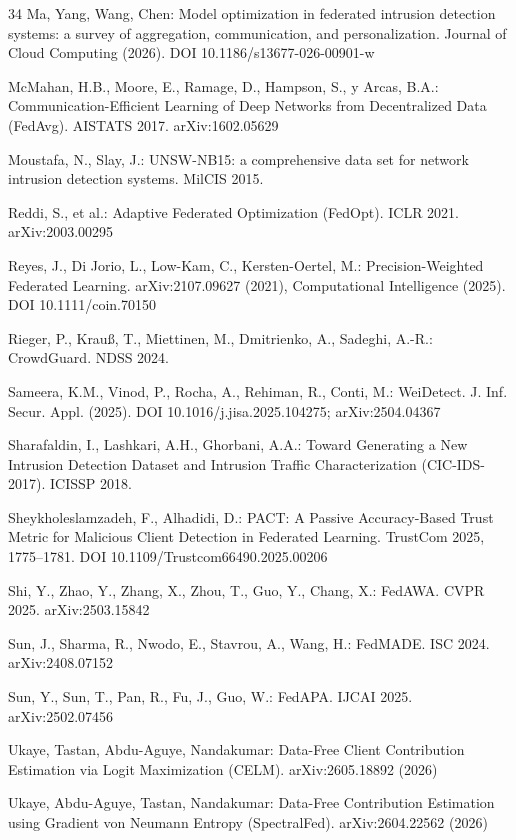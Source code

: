 \documentclass{llncs}
\begin{document}
\begin{thebibliography}{34}
 Ma, Yang, Wang, Chen: Model optimization in federated intrusion detection systems: a survey of aggregation, communication, and personalization. Journal of Cloud Computing (2026). DOI 10.1186/s13677-026-00901-w

 McMahan, H.B., Moore, E., Ramage, D., Hampson, S., y Arcas, B.A.: Communication-Efficient Learning of Deep Networks from Decentralized Data (FedAvg). AISTATS 2017. arXiv:1602.05629

 Moustafa, N., Slay, J.: UNSW-NB15: a comprehensive data set for network intrusion detection systems. MilCIS 2015.

 Reddi, S., et al.: Adaptive Federated Optimization (FedOpt). ICLR 2021. arXiv:2003.00295

 Reyes, J., Di Jorio, L., Low-Kam, C., Kersten-Oertel, M.: Precision-Weighted Federated Learning. arXiv:2107.09627 (2021), Computational Intelligence (2025). DOI 10.1111/coin.70150

 Rieger, P., Krau{\ss}, T., Miettinen, M., Dmitrienko, A., Sadeghi, A.-R.: CrowdGuard. NDSS 2024.

 Sameera, K.M., Vinod, P., Rocha, A., Rehiman, R., Conti, M.: WeiDetect. J. Inf. Secur. Appl. (2025). DOI 10.1016/j.jisa.2025.104275; arXiv:2504.04367

 Sharafaldin, I., Lashkari, A.H., Ghorbani, A.A.: Toward Generating a New Intrusion Detection Dataset and Intrusion Traffic Characterization (CIC-IDS-2017). ICISSP 2018.

 Sheykholeslamzadeh, F., Alhadidi, D.: PACT: A Passive Accuracy-Based Trust Metric for Malicious Client Detection in Federated Learning. TrustCom 2025, 1775--1781. DOI 10.1109/Trustcom66490.2025.00206

 Shi, Y., Zhao, Y., Zhang, X., Zhou, T., Guo, Y., Chang, X.: FedAWA. CVPR 2025. arXiv:2503.15842

 Sun, J., Sharma, R., Nwodo, E., Stavrou, A., Wang, H.: FedMADE. ISC 2024. arXiv:2408.07152

 Sun, Y., Sun, T., Pan, R., Fu, J., Guo, W.: FedAPA. IJCAI 2025. arXiv:2502.07456

 Ukaye, Tastan, Abdu-Aguye, Nandakumar: Data-Free Client Contribution Estimation via Logit Maximization (CELM). arXiv:2605.18892 (2026)

 Ukaye, Abdu-Aguye, Tastan, Nandakumar: Data-Free Contribution Estimation using Gradient von Neumann Entropy (SpectralFed). arXiv:2604.22562 (2026)


\end{thebibliography}
\end{document}
